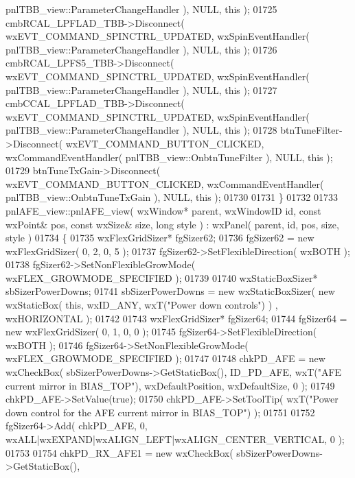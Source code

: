 \begin{DoxyCode}
      pnlTBB_view::ParameterChangeHandler ), NULL, \textcolor{keyword}{this} );
01725     cmbRCAL_LPFLAD_TBB->Disconnect( wxEVT\_COMMAND\_SPINCTRL\_UPDATED, wxSpinEventHandler( 
      pnlTBB_view::ParameterChangeHandler ), NULL, \textcolor{keyword}{this} );
01726     cmbRCAL_LPFS5_TBB->Disconnect( wxEVT\_COMMAND\_SPINCTRL\_UPDATED, wxSpinEventHandler( 
      pnlTBB_view::ParameterChangeHandler ), NULL, \textcolor{keyword}{this} );
01727     cmbCCAL_LPFLAD_TBB->Disconnect( wxEVT\_COMMAND\_SPINCTRL\_UPDATED, wxSpinEventHandler( 
      pnlTBB_view::ParameterChangeHandler ), NULL, \textcolor{keyword}{this} );
01728     btnTuneFilter->Disconnect( wxEVT\_COMMAND\_BUTTON\_CLICKED, wxCommandEventHandler( 
      pnlTBB_view::OnbtnTuneFilter ), NULL, \textcolor{keyword}{this} );
01729     btnTuneTxGain->Disconnect( wxEVT\_COMMAND\_BUTTON\_CLICKED, wxCommandEventHandler( 
      pnlTBB_view::OnbtnTuneTxGain ), NULL, \textcolor{keyword}{this} );
01730     
01731 \}
01732 
01733 pnlAFE_view::pnlAFE_view( wxWindow* parent, wxWindowID \textcolor{keywordtype}{id}, \textcolor{keyword}{const} wxPoint& pos, \textcolor{keyword}{const} wxSize& 
      size, \textcolor{keywordtype}{long} style ) : wxPanel( parent, id, pos, size, style )
01734 \{
01735     wxFlexGridSizer* fgSizer62;
01736     fgSizer62 = \textcolor{keyword}{new} wxFlexGridSizer( 0, 2, 0, 5 );
01737     fgSizer62->SetFlexibleDirection( wxBOTH );
01738     fgSizer62->SetNonFlexibleGrowMode( wxFLEX\_GROWMODE\_SPECIFIED );
01739     
01740     wxStaticBoxSizer* sbSizerPowerDowns;
01741     sbSizerPowerDowns = \textcolor{keyword}{new} wxStaticBoxSizer( \textcolor{keyword}{new} wxStaticBox( \textcolor{keyword}{this}, wxID\_ANY, wxT(\textcolor{stringliteral}{"Power down controls"}) )
      , wxHORIZONTAL );
01742     
01743     wxFlexGridSizer* fgSizer64;
01744     fgSizer64 = \textcolor{keyword}{new} wxFlexGridSizer( 0, 1, 0, 0 );
01745     fgSizer64->SetFlexibleDirection( wxBOTH );
01746     fgSizer64->SetNonFlexibleGrowMode( wxFLEX\_GROWMODE\_SPECIFIED );
01747     
01748     chkPD_AFE = \textcolor{keyword}{new} wxCheckBox( sbSizerPowerDowns->GetStaticBox(), ID_PD_AFE, wxT(\textcolor{stringliteral}{"AFE current mirror in
       BIAS\_TOP"}), wxDefaultPosition, wxDefaultSize, 0 );
01749     chkPD_AFE->SetValue(\textcolor{keyword}{true}); 
01750     chkPD_AFE->SetToolTip( wxT(\textcolor{stringliteral}{"Power down control for the AFE current mirror in BIAS\_TOP"}) );
01751     
01752     fgSizer64->Add( chkPD_AFE, 0, wxALL|wxEXPAND|wxALIGN\_LEFT|wxALIGN\_CENTER\_VERTICAL, 0 );
01753     
01754     chkPD_RX_AFE1 = \textcolor{keyword}{new} wxCheckBox( sbSizerPowerDowns->GetStaticBox(), 

\end{DoxyCode}
